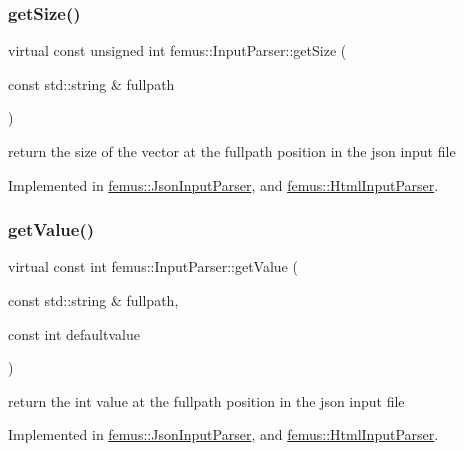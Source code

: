 \subsubsection{\texorpdfstring{get\+Size()}{getSize()}}
{\footnotesize\ttfamily virtual const unsigned int femus\+::\+Input\+Parser\+::get\+Size (\begin{DoxyParamCaption}\item[{const std\+::string \&}]{fullpath }\end{DoxyParamCaption})\hspace{0.3cm}{\ttfamily [pure virtual]}}

return the size of the vector at the {\ttfamily fullpath} position in the json input file 

Implemented in \mbox{\hyperlink{classfemus_1_1_json_input_parser_a535b2e19baf4fff32dc5fa54816b0496}{femus\+::\+Json\+Input\+Parser}}, and \mbox{\hyperlink{classfemus_1_1_html_input_parser_ae9780db87b1b85ebb52f56f7033c459a}{femus\+::\+Html\+Input\+Parser}}.

\mbox{\label{classfemus_1_1_input_parser_ae178b5210e0a7df40b7eb78133cac13c}} 
\subsubsection{\texorpdfstring{get\+Value()}{getValue()}\hspace{0.1cm}{\footnotesize\ttfamily [1/6]}}
{\footnotesize\ttfamily virtual const int femus\+::\+Input\+Parser\+::get\+Value (\begin{DoxyParamCaption}\item[{const std\+::string \&}]{fullpath,  }\item[{const int}]{defaultvalue }\end{DoxyParamCaption})\hspace{0.3cm}{\ttfamily [pure virtual]}}

return the int value at the {\ttfamily fullpath} position in the json input file 

Implemented in \mbox{\hyperlink{classfemus_1_1_json_input_parser_a7446c6ec4674101f6e0ad48778122076}{femus\+::\+Json\+Input\+Parser}}, and \mbox{\hyperlink{classfemus_1_1_html_input_parser_a7c0f0684f37a1c09030a96051260249f}{femus\+::\+Html\+Input\+Parser}}.

